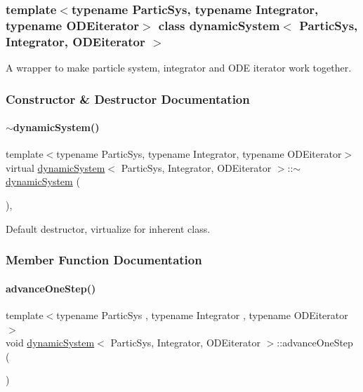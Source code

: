 \subsubsection*{template$<$typename Partic\+Sys, typename Integrator, typename O\+D\+Eiterator$>$\newline
class dynamic\+System$<$ Partic\+Sys, Integrator, O\+D\+Eiterator $>$}

A wrapper to make particle system, integrator and O\+DE iterator work together. 

\subsubsection{Constructor \& Destructor Documentation}
\mbox{\label{classdynamic_system_a5818e6ffd72fcbfcac01738f5cb8d7a3}} 
\paragraph{\texorpdfstring{$\sim$dynamic\+System()}{~dynamicSystem()}}
{\footnotesize\ttfamily template$<$typename Partic\+Sys, typename Integrator, typename O\+D\+Eiterator$>$ \\
virtual \mbox{\hyperlink{classdynamic_system}{dynamic\+System}}$<$ Partic\+Sys, Integrator, O\+D\+Eiterator $>$\+::$\sim$\mbox{\hyperlink{classdynamic_system}{dynamic\+System}} (\begin{DoxyParamCaption}{ }\end{DoxyParamCaption})\hspace{0.3cm}{\ttfamily [inline]}, {\ttfamily [virtual]}}



Default destructor, virtualize for inherent class. 



\subsubsection{Member Function Documentation}
\mbox{\label{classdynamic_system_a3b6569e359c6451a038107455903c6a1}} 
\paragraph{\texorpdfstring{advance\+One\+Step()}{advanceOneStep()}}
{\footnotesize\ttfamily template$<$typename Partic\+Sys , typename Integrator , typename O\+D\+Eiterator $>$ \\
void \mbox{\hyperlink{classdynamic_system}{dynamic\+System}}$<$ Partic\+Sys, Integrator, O\+D\+Eiterator $>$\+::advance\+One\+Step (\begin{DoxyParamCaption}{ }\end{DoxyParamCaption})\hspace{0.3cm}{\ttfamily [inline]}}



